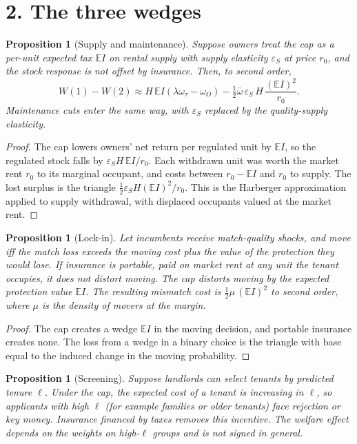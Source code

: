 \documentclass[11pt]{article}
\newtheorem{proposition}[theorem]{Proposition}
\theoremstyle{definition}
\begin{document}
\section*{2. The three wedges}
\begin{proposition}[Supply and maintenance]\label{prop:supply}
Suppose owners treat the cap as a per-unit expected tax $\mathbb EI$ on rental supply with supply elasticity $\varepsilon_S$
at price $r_0$, and the stock response is not offset by insurance. Then, to second order,
\[
 W(1)-W(2)\approx H\,\mathbb EI(\lambda\omega_\tau-\omega_O)-\tfrac12\bar\omega\,\varepsilon_S\,H\,\frac{(\mathbb EI)^2}{r_0}.
\]
Maintenance cuts enter the same way, with $\varepsilon_S$ replaced by the quality-supply elasticity.
\end{proposition}
\begin{proof}
The cap lowers owners' net return per regulated unit by $\mathbb EI$, so the regulated stock falls by
$\varepsilon_SH\,\mathbb EI/r_0$. Each withdrawn unit was worth the market rent $r_0$ to its marginal occupant, and
costs between $r_0-\mathbb EI$ and $r_0$ to supply. The lost surplus is the triangle $\tfrac12\varepsilon_SH(\mathbb EI)^2/r_0$.
This is the Harberger approximation applied to supply withdrawal, with displaced occupants valued at the market rent.
\end{proof}
\begin{proposition}[Lock-in]\label{prop:lock}
Let incumbents receive match-quality shocks, and move iff the match loss exceeds the moving cost plus the value of the
protection they would lose. If insurance is \emph{portable}, paid on market rent at any unit the tenant occupies, it does
not distort moving. The cap distorts moving by the expected protection value $\mathbb E I$. The resulting mismatch cost is
$\tfrac12\mu\,(\mathbb EI)^2$ to second order, where $\mu$ is the density of movers at the margin.
\end{proposition}
\begin{proof}
The cap creates a wedge $\mathbb EI$ in the moving decision, and portable insurance creates none. The loss from a wedge in a
binary choice is the triangle with base equal to the induced change in the moving probability.
\end{proof}
\begin{proposition}[Screening]\label{prop:screen}
Suppose landlords can select tenants by predicted tenure $\ell$. Under the cap, the expected cost of a tenant is
increasing in $\ell$, so applicants with high $\ell$ (for example families or older tenants) face rejection or key money.
Insurance financed by taxes removes this incentive. The welfare effect depends on the weights on high-$\ell$ groups and is
not signed in general.
\end{proposition}
\end{document}
